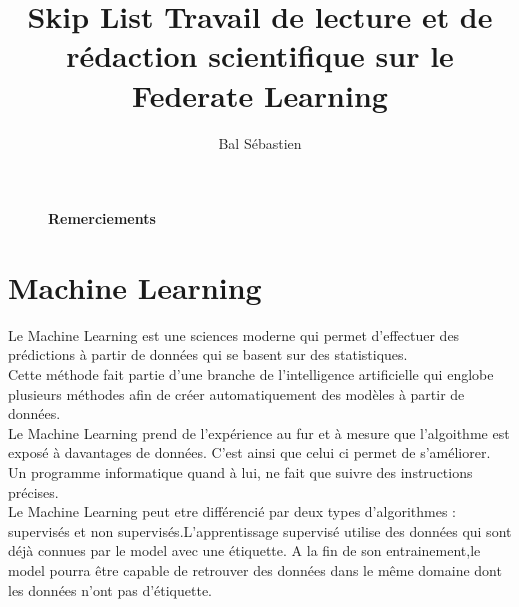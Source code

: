 \documentclass[12pt,a4paper]{report}
\begin{document}
\title{\Large{\textbf{Skip List \vskip3pt \Large Travail de lecture et de rédaction scientifique sur le Federate Learning}}}

\author{Bal Sébastien}

\maketitle

\thispagestyle{empty} %


 


\begin{figure}[p]

\large\textbf{Remerciements}

\end{figure}


 

\thispagestyle{plain}\setcounter{page}{1} %


 

\fancyhead[LE,RO]{\leftmark}

\fancyhead[RE,LO]{}

\fancyfoot[R]{\textbf{\thepage}}



 

\tableofcontents

\chapter{Machine Learning}

Le Machine Learning est une sciences moderne qui permet d'effectuer des prédictions à partir de données qui se basent sur des statistiques. \\

Cette méthode fait partie d'une branche de l'intelligence artificielle qui englobe plusieurs méthodes afin de créer automatiquement des modèles à partir de données. \\

Le Machine Learning prend de l'expérience au fur et à mesure que l'algoithme est exposé à davantages de données. C'est ainsi que celui ci permet de s'améliorer. Un programme informatique quand à lui, ne fait que suivre des instructions précises.\\

Le Machine Learning peut etre différencié par deux types d'algorithmes : supervisés et non supervisés.L'apprentissage supervisé utilise des données qui sont déjà connues par le model avec une étiquette. A la fin de son entrainement,le model pourra être capable de retrouver des données dans le même domaine dont les données n'ont pas d'étiquette.\\
\end{document}
